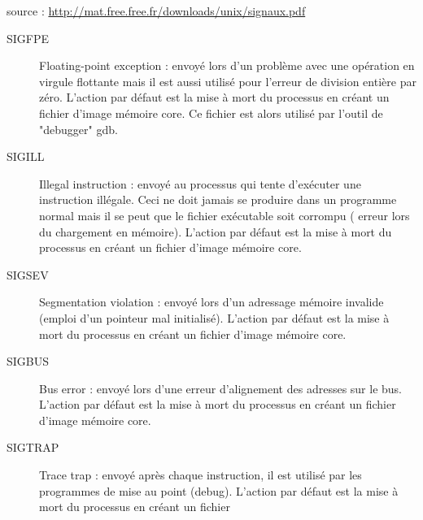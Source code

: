\documentclass[10pt,french,A4]{article}
\theoremstyle{plain}
\begin{document}
source : \url{http://mat.free.free.fr/downloads/unix/signaux.pdf}
\begin{description}
    \item[SIGFPE]  Floating-point exception : envoyé lors d'un problème avec une opération en
    virgule flottante mais il est aussi utilisé pour l'erreur de division entière par
    zéro. L'action par défaut est la mise à mort du processus en créant un fichier
    d'image mémoire core. Ce fichier est alors utilisé par l'outil de "debugger"
    gdb.
    \item[SIGILL] Illegal instruction : envoyé au processus qui tente d'exécuter une instruction
    illégale. Ceci ne doit jamais se produire dans un programme normal mais il se
    peut que le fichier exécutable soit corrompu ( erreur lors du chargement en
    mémoire). L'action par défaut est la mise à mort du processus en créant un
    fichier d'image mémoire core.
    \item[SIGSEV] Segmentation violation : envoyé lors d'un adressage mémoire invalide (emploi
    d'un pointeur mal initialisé). L'action par défaut est la mise à mort du
    processus en créant un fichier d'image mémoire core.
    \item[SIGBUS] Bus error : envoyé lors d'une erreur d'alignement des adresses sur le bus.
    L'action par défaut est la mise à mort du processus en créant un fichier
    d'image mémoire core.
    \item[SIGTRAP] Trace trap : envoyé après chaque instruction, il est utilisé par les programmes
    de mise au point (debug).
    L'action par défaut est la mise à mort du processus en créant un fichier
\end{description}
\end{document}
